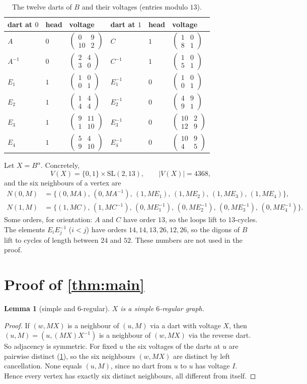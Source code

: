 \documentclass[11pt]{article}
\numberwithin{equation}{section}
\newtheorem{lemma}[theorem]{Lemma}
\theoremstyle{definition}
\theoremstyle{remark}
\newcommand{\SL}{\mathrm{SL}}
\newcommand{\mat}[4]{\left(\begin{smallmatrix}#1&#2\\#3&#4\end{smallmatrix}\right)}
\begin{document}
\begin{table}[ht]
\centering
\small
\begin{tabular}{@{}lll@{\qquad}lll@{}}
\toprule
dart at $0$ & head & voltage & dart at $1$ & head & voltage\\
\midrule
$A$ & $0$ & $\mat{0}{9}{10}{2}$ & $C$ & $1$ & $\mat{1}{0}{8}{1}$\\
$A^{-1}$ & $0$ & $\mat{2}{4}{3}{0}$ & $C^{-1}$ & $1$ & $\mat{1}{0}{5}{1}$\\
$E_1$ & $1$ & $\mat{1}{0}{0}{1}$ & $E_1^{-1}$ & $0$ & $\mat{1}{0}{0}{1}$\\
$E_2$ & $1$ & $\mat{1}{4}{4}{4}$ & $E_2^{-1}$ & $0$ & $\mat{4}{9}{9}{1}$\\
$E_3$ & $1$ & $\mat{9}{11}{1}{10}$ & $E_3^{-1}$ & $0$ & $\mat{10}{2}{12}{9}$\\
$E_4$ & $1$ & $\mat{5}{4}{9}{10}$ & $E_4^{-1}$ & $0$ & $\mat{10}{9}{4}{5}$\\
\bottomrule
\end{tabular}
\caption{The twelve darts of $B$ and their voltages (entries modulo $13$).}
\label{tab:darts}
\end{table}

Let $X=B^\alpha$. Concretely,
\[
  V(X)=\{0,1\}\times\SL(2,13),\qquad |V(X)|=4368,
\]
and the six neighbours of a vertex are
\begin{align*}
  N(0,M)&=\{(0,MA),\,(0,MA^{-1}),\,(1,ME_1),\,(1,ME_2),\,(1,ME_3),\,(1,ME_4)\},\\
  N(1,M)&=\{(1,MC),\,(1,MC^{-1}),\,(0,ME_1^{-1}),\,(0,ME_2^{-1}),\,(0,ME_3^{-1}),\,(0,ME_4^{-1})\}.
\end{align*}
Some orders, for orientation: $A$ and $C$ have order $13$, so the loops lift to $13$-cycles. The
elements $E_iE_j^{-1}$ ($i<j$) have orders $14,14,13,26,12,26$, so the digons of $B$ lift to cycles
of length between $24$ and $52$. These numbers are not used in the proof.

\section{Proof of \cref{thm:main}}\label{sec:proof}

\begin{lemma}[simple and $6$-regular]\label{lem:simple}
$X$ is a simple $6$-regular graph.
\end{lemma}
\begin{proof}
If $(w,MX)$ is a neighbour of $(u,M)$ via a dart with voltage $X$, then $(u,M)=(u,(MX)X^{-1})$ is a
neighbour of $(w,MX)$ via the reverse dart. So adjacency is symmetric.
For fixed $u$ the six voltages of the darts at $u$ are pairwise distinct (\cref{tab:darts}), so
the six neighbours $(w,MX)$ are distinct by left cancellation. None equals $(u,M)$, since no dart
from $u$ to $u$ has voltage $I$. Hence every vertex has exactly six distinct neighbours, all
different from itself.
\end{proof}
\end{document}
